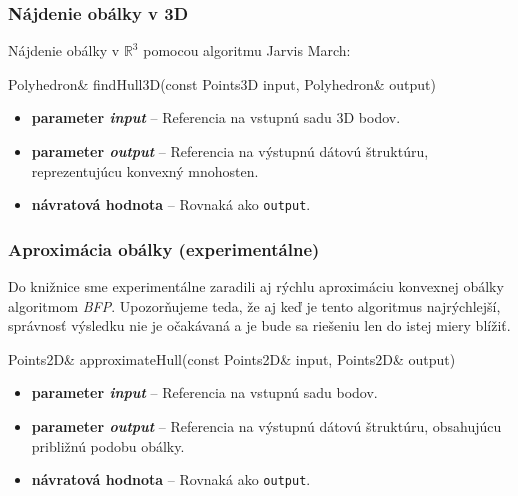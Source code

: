 \documentclass[a4paper, 12pt, slovak]{article}
\begin{document}
\subsubsection{Nájdenie obálky v 3D}

Nájdenie obálky v $\mathbb{R}^3$ pomocou algoritmu Jarvis March:

\begin{c++}
Polyhedron& findHull3D(const Points3D input, Polyhedron& output)
\end{c++}

\begin{itemize}
 \item \textbf{parameter \textit{input}} -- Referencia na vstupnú sadu 3D bodov. 
 \item \textbf{parameter \textit{output}} -- Referencia na výstupnú dátovú 
štruktúru, reprezentujúcu konvexný mnohosten.
 \item \textbf{návratová hodnota} -- Rovnaká ako \texttt{output}.
\end{itemize}

\subsubsection{Aproximácia obálky (experimentálne)}
Do knižnice sme experimentálne zaradili aj rýchlu aproximáciu konvexnej obálky 
algoritmom \emph{BFP}. Upozorňujeme teda, že aj keď je tento algoritmus 
najrýchlejší, správnosť výsledku nie je očakávaná a je bude sa riešeniu len do istej 
miery blížiť.

\begin{c++}
Points2D& approximateHull(const Points2D& input, Points2D& output)
\end{c++}

\begin{itemize}
 \item \textbf{parameter \textit{input}} -- Referencia na vstupnú sadu bodov. 
 \item \textbf{parameter \textit{output}} -- Referencia na výstupnú dátovú 
štruktúru, obsahujúcu približnú podobu obálky.
 \item \textbf{návratová hodnota} -- Rovnaká ako \texttt{output}.
\end{itemize}
\end{document}
